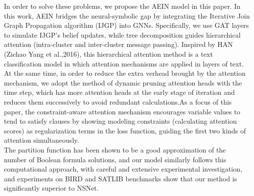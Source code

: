 In order to solve these problems, we propose the AEIN model in this paper. In this work, AEIN bridges 
the neural-symbolic gap by integrating the Iterative Join Graph Propagation  algorithm (IJGP)\cite{A15} 
into GNNs.   Specifically, we use GAT layers to simulate IJGP's belief updates, while tree decomposition 
guides hierarchical attention (intra-cluster and inter-cluster message passing). Inspired by HAN
(Zichao Yang et al.,2016)\cite{B5}, this hierarchical attention method is a text classification model in 
which attention mechanisms are applied in layers of text. At the same time, in order to reduce the extra 
verhead brought by the attention mechanism, we adopt the method of dynamic pruning attention heads with 
the time step\cite{B6}\cite{A16}, which has more attention heads at the early stage of iteration and reduces 
them successively to avoid redundant calculations.As a focus of this paper, the constraint-aware attention 
mechanism encourages variable values to tend to satisfy clauses by showing modeling constraints 
(calculating attention scores) as regularization terms in the loss function, guiding the first two kinds 
of attention simultaneously. \\

The partition function has been shown to be a good approximation of the number of Boolean formula 
solutions\cite{A17}\cite{A18}, and our model similarly follows this computational approach, with careful 
and extensive experimental investigation, and experiments on BIRD and SATLIB benchmarks show that our 
method is significantly superior to NSNet. 
